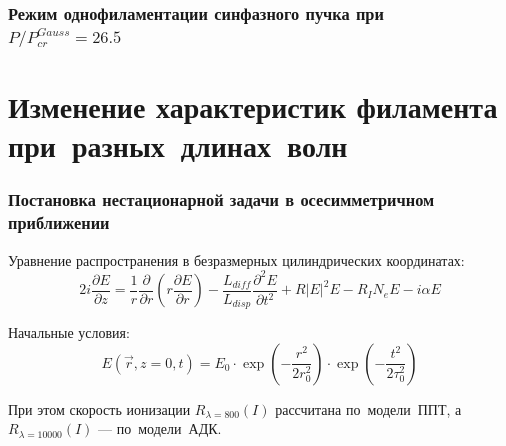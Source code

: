 \documentclass[fullscreen=true,unicode,bookmarks=true]{beamer}
\begin{document}
    \begin{frame}
        \frametitle{Режим однофиламентации синфазного пучка при ~$P/P_{cr}^{Gauss} = 26.5$}

            \begin{center}
            \end{center}
    \end{frame}

    \section{Изменение характеристик филамента при~разных~длинах~волн}

    \begin{frame}
        \frametitle{Постановка нестационарной задачи в осесимметричном приближении}

            Уравнение распространения в безразмерных цилиндрических координатах:
			\begin{equation*}
			2 i \dfrac{\partial E}{\partial z} = \dfrac{1}{r}\dfrac{\partial}{\partial r}\left(r\dfrac{\partial E}{\partial r}\right)
			- \dfrac{L_{diff}}{L_{disp}} \dfrac{\partial^2 E}{\partial t^2} + R |E|^2 E - R_{I} N_{e} E - i \alpha E
			\end{equation*}

            Начальные условия:
			\begin{equation*}\label{PulsesInitialConditions}
			E(\vec{r}, z = 0, t) = E_0 \cdot \exp\left(-\frac{r^2}{2 r_0^2}\right) \cdot \exp\left(-\frac{t^2}{2 \tau_0^2}\right)
			\end{equation*}
			
			При этом скорость ионизации $R_{\lambda=800}(I)$ рассчитана по~модели~ППТ, а~$R_{\lambda=10000}(I)$ --- по~модели~АДК.
    \end{frame}	
\end{document}
